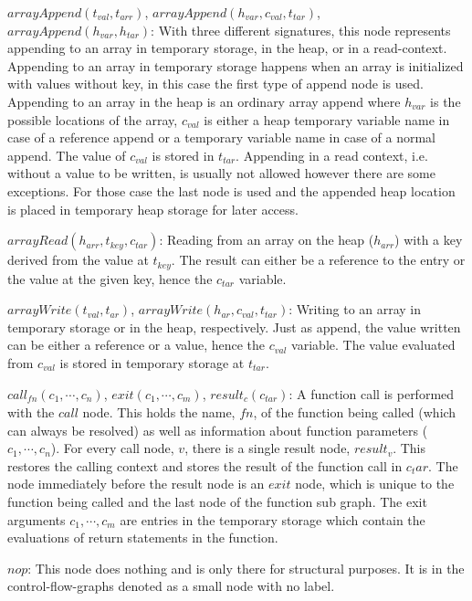 \begin{description}
\item{$\mathit{arrayAppend}(t_{val}, t_{arr})$, $\mathit{arrayAppend}(h_{var}, c_{val}, t_{tar})$, $\mathit{arrayAppend}(h_{var}, h_{tar})$:} With three different signatures, this node represents appending to an array in temporary storage, in the heap, or in a read-context. Appending to an array in temporary storage happens when an array is initialized with values without key, in this case the first type of append node is used. Appending to an array in the heap is an ordinary array append where $h_{var}$ is the possible locations of the array, $c_{val}$ is either a heap temporary variable name in case of a reference append or a temporary variable name in case of a normal append. The value of $c_{val}$ is stored in $t_{tar}$. Appending in a read context, i.e. without a value to be written, is usually not allowed however there are some exceptions. For those case the last node is used and the appended heap location is placed in temporary heap storage for later access.
\item{$\mathit{arrayRead}(h_{arr}, t_{key}, c_{tar})$:} Reading from an array on the heap ($h_{arr}$) with a key derived from the value at $t_{key}$. The result can either be a reference to the entry or the value at the given key, hence the $c_{tar}$ variable. 
\item{$\mathit{arrayWrite}(t_{val}, t_{ar})$, $\mathit{arrayWrite}(h_{ar}, c_{val}, t_{tar})$:} Writing to an array in temporary storage or in the heap, respectively. Just as append, the value written can be either a reference or a value, hence the $c_{val}$ variable. The value evaluated from $c_{val}$ is stored in temporary storage at $t_{tar}$.
\item{$\mathit{call}_{\mathit{fn}}(c_1, \cdots, c_n)$, $\mathit{exit}(c_1, \cdots, c_m)$, $\mathit{result}_{c}(c_{tar})$:} A function call is performed with the $\mathit{call}$ node. This holds the name, $\mathit{fn}$, of the function being called (which can always be resolved) as well as information about function parameters ($c_1, \cdots, c_n$). For every call node, $v$, there is a single result node, $\mathit{result}_v$. This restores the calling context and stores the result of the function call in $c_tar$. The node immediately before the result node is an $\mathit{exit}$ node, which is unique to the function being called and the last node of the function sub graph. The exit arguments $c_1, \cdots, c_m$ are entries in the temporary storage which contain the evaluations of return statements in the function.
\item{$nop$:} This node does nothing and is only there for structural purposes. It is in the control-flow-graphs denoted as a small node with no label.
\end{description}

